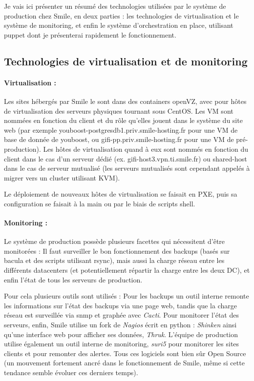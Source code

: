 \documentclass[14 pt,a4paper]{extreport}
\begin{document}
Je vais ici présenter un résumé des technologies utilisées par le système de production chez Smile, en deux parties : les technologies de virtualisation et le système de monitoring, et enfin le système d'orchestration en place, utilisant puppet dont je présenterai rapidement le fonctionnement.
\subsection{Technologies de virtualisation et de monitoring}
\paragraph{Virtualisation :}Les sites hébergés par Smile le sont dans des containers openVZ, avec pour hôtes de virtualisation des serveurs physiques tournant sous CentOS. Les VM sont nommées en fonction du client et du rôle qu'elles jouent dans le système du site web (par exemple youboost-postgresdb1.priv.smile-hosting.fr pour une VM de base de donnée de youboost, ou gifi-pp.priv.smile-hosting.fr pour une VM de pré-production). Les hôtes de virtualisation quand à eux sont nommés en fonction du client dans le cas d'un serveur dédié (ex. gifi-host3.vpn.ti.smile.fr) ou shared-host dans le cas de serveur mutualisé (les serveurs mutualisés sont cependant appelés à migrer vers un cluster utilisant KVM).

Le déploiement de nouveaux hôtes de virtualisation se faisait en PXE, puis sa configuration se faisait à la main ou par le biais de scripts shell.


\paragraph{Monitoring :}Le système de production possède plusieurs facettes qui nécessitent d'être monitorées : Il faut surveiller le bon fonctionnement des backups (basés sur bacula et des scripts utilisant rsync), mais aussi la charge réseau entre les différents datacenters (et potentiellement répartir la charge entre les deux DC), et enfin l'état de tous les serveurs de production.

Pour cela plusieurs outils sont utilisés : Pour les backups un outil interne remonte les informations sur l'état des backups via une page web, tandis que la charge réseau est surveillée via snmp et graphée avec \emph{Cacti}. Pour monitorer l'état des serveurs, enfin, Smile utilise un fork de \emph{Nagios} écrit en python : \emph{Shinken} ainsi qu'une interface web pour afficher ses données, \emph{Thruk}. L'équipe de production utilise également un outil interne de monitoring, \emph{suri5} pour monitorer les sites clients et pour remonter des alertes. Tous ces logiciels sont bien sûr Open Source (un mouvement fortement ancré dans le fonctionnement de Smile, même si cette tendance semble évoluer ces derniers temps).
\end{document}
